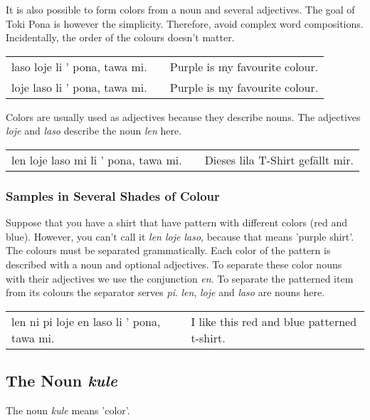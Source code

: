 It is also possible to form colors from a noun and several adjectives. 
The goal of Toki Pona is however the simplicity.
Therefore, avoid complex word compositions.
Incidentally, the order of the colours doesn't matter.

\begin{supertabular}{p{5,5cm}|ll}
laso loje  li ' pona, tawa mi. && Purple is my favourite colour.  \\ %
loje laso  li ' pona, tawa mi. && Purple is my favourite colour.  \\
\end{supertabular}

Colors are usually used as adjectives because they describe nouns. 
The adjectives \textit{loje} and \textit{laso} describe the noun \textit{len} here.

\begin{supertabular}{p{5,5cm}|ll}
len loje laso mi li ' pona, tawa mi. && Dieses lila T-Shirt gefällt mir. \\
\end{supertabular}

%
%
\subsubsection*{Samples in Several Shades of Colour}
%
%
Suppose that you have a shirt that have pattern with different colors (red and blue). 
However, you can't call it \textit{len loje laso}, because that means 'purple shirt'. 
The colours must be separated grammatically. 
Each color of the pattern is described with a noun and optional adjectives. 
To separate these color nouns with their adjectives we use the conjunction \textit{en}.
To separate the patterned item from its colours the separator serves \textit{pi}.
\textit{len}, \textit{loje} and \textit{laso} are nouns here. 

\begin{supertabular}{p{5,5cm}|ll}
len ni pi loje en laso li ' pona, tawa mi. && I like this red and blue patterned t-shirt. \\
\end{supertabular} 

%
\subsection*{The Noun \textit{kule}}
%
%
The noun \textit{kule} means 'color'. 

